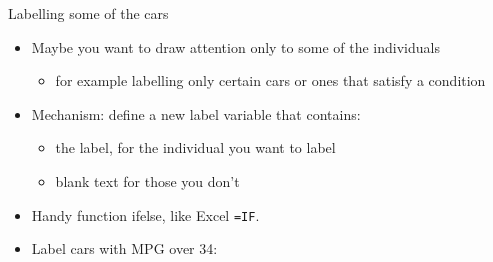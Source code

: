 \documentclass[ignorenonframetext,]{beamer}
\newenvironment{Shaded}{\begin{snugshade}}{\end{snugshade}}
\newcommand{\DataTypeTok}[1]{\textcolor[rgb]{0.13,0.29,0.53}{#1}}
\newcommand{\DecValTok}[1]{\textcolor[rgb]{0.00,0.00,0.81}{#1}}
\newcommand{\KeywordTok}[1]{\textcolor[rgb]{0.13,0.29,0.53}{\textbf{#1}}}
\newcommand{\NormalTok}[1]{#1}
\newcommand{\OperatorTok}[1]{\textcolor[rgb]{0.81,0.36,0.00}{\textbf{#1}}}
\newcommand{\StringTok}[1]{\textcolor[rgb]{0.31,0.60,0.02}{#1}}
\providecommand{\tightlist}{%
  \setlength{\itemsep}{0pt}\setlength{\parskip}{0pt}}
\begin{document}
\begin{frame}[fragile]{Labelling some of the cars}
\protect\hypertarget{labelling-some-of-the-cars}{}

\begin{itemize}
\tightlist
\item
  Maybe you want to draw attention only to some of the individuals

  \begin{itemize}
  \tightlist
  \item
    for example labelling only certain cars or ones that satisfy a
    condition
  \end{itemize}
\item
  Mechanism: define a new label variable that contains:

  \begin{itemize}
  \tightlist
  \item
    the label, for the individual you want to label
  \item
    blank text for those you don't
  \end{itemize}
\item
  Handy function ifelse, like Excel \texttt{=IF}.
\item
  Label cars with MPG over 34:
\end{itemize}

\begin{Shaded}
\end{Shaded}

\end{frame}
\end{document}
